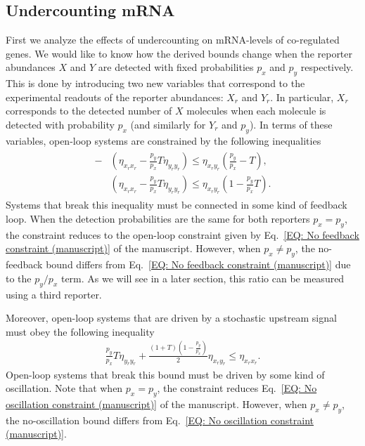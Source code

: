 \documentclass[%
 reprint,prx,
superscriptaddress,
%
%
%
%
%
%
%
%
%
 amsmath,amssymb,
 aps,
%
%
%
%
%
%
]{revtex4-2}
\begin{document}
{{\subsection{Undercounting mRNA}
\vspace{-0.1cm}
First we analyze the effects of undercounting on mRNA-levels of co-regulated genes. 
We would like to know how the derived bounds change when the reporter abundances $X$ and $Y$ are detected with fixed probabilities $p_{x}$ and $p_{y}$ respectively. This is done by introducing two new variables that correspond to the experimental readouts of the reporter abundances: $X_{r}$ and $Y_{r}$. In particular, $X_{r}$ corresponds to the detected number of $X$ molecules when each molecule is detected with probability $p_{x}$ (and similarly for $Y_{r}$ and $p_{y}$). In terms of these variables, open-loop systems are constrained by the following inequalities 
\begin{align}
\begin{split}
    -&\left(\eta_{x_{r}x_{r}} - \frac{p_{y}}{p_{x}}T\eta_{y_{r}y_{r}}\right) \leq \eta_{x_{r}y_{r}}\left(\frac{p_{y}}{p_{x}} - T\right), \\  &\left(\eta_{x_{r}x_{r}} - \frac{p_{y}}{p_{x}}T\eta_{y_{r}y_{r}}\right) \leq \eta_{x_{r}y_{r}}\left(1 - \frac{p_{y}}{p_{x}}T\right) .
    \end{split}
    \label{EQ: Undercounting-1step-nofeedback-bound}
\end{align}
Systems that break this inequality must be connected in some kind of feedback loop. When the detection probabilities are the same for both reporters $p_{x} = p_{y}$, the constraint reduces to the open-loop constraint given by Eq.~\eqref{EQ: No feedback constraint (manuscript)} of the manuscript. However, when $p_{x} \neq p_{y}$, the no-feedback bound differs from Eq.~\eqref{EQ: No feedback constraint (manuscript)} due to the $p_{y}/p_{x}$ term. As we will see in a later section, this ratio can be measured using a third reporter. 

Moreover, open-loop systems that are driven by a stochastic upstream signal must obey the following inequality 
\begin{align}
    \frac{p_{y}}{p_{x}}T\eta_{y_{r}y_{r}} + \frac{(1+T)\left(1 - \frac{p_{y}}{p_{x}}\right)}{2}\eta_{x_{r}y_{r}} \leq \eta_{x_{r}x_{r}} .  
    \label{EQ: Undercounting-1step-no-oscillation-bound}
\end{align}
Open-loop systems that break this bound must be driven by some kind of oscillation. Note that when $p_{x} = p_{y}$, the constraint reduces Eq.~\eqref{EQ: No oscillation constraint (manuscript)}  of the manuscript. However, when $p_{x} \neq p_{y}$, the no-oscillation bound differs from Eq.~\eqref{EQ: No oscillation constraint (manuscript)}. \\




}}
\end{document}

